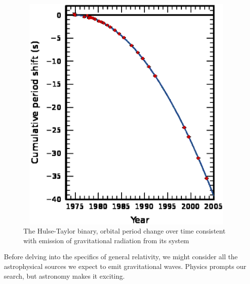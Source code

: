 	\begin{figure}
	\begin{center}
	\includegraphics[height=120mm, width=160mm]{500px-PSR_B1913+16_period_shift_graph.eps}
	\caption{The Hulse-Taylor binary, orbital period change over time consistent with emission of gravitational radiation from its system}
	\label{Hulse-Taylor_binary}
	\end{center}
	\end{figure}

		Before delving into the specifics of general relativity, we might consider all the astrophysical sources we expect to emit gravitational waves. Physics prompts our search, but astronomy makes it exciting.


